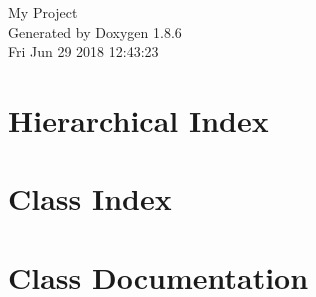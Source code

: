 \documentclass[twoside]{book}
\newcommand{\clearemptydoublepage}{%
  \newpage{\pagestyle{empty}\cleardoublepage}%
}
\begin{document}
\hypersetup{pageanchor=false}
\begin{titlepage}
\vspace*{7cm}
\begin{center}%
{\Large My Project }\\
\vspace*{1cm}
{\large Generated by Doxygen 1.8.6}\\
\vspace*{0.5cm}
{\small Fri Jun 29 2018 12:43:23}\\
\end{center}
\end{titlepage}
\clearemptydoublepage
\tableofcontents
\clearemptydoublepage
{}
\hypersetup{pageanchor=true}

\chapter{Hierarchical Index}

\chapter{Class Index}

\chapter{Class Documentation}























































\newpage
{}
{}
\printindex
\end{document}
